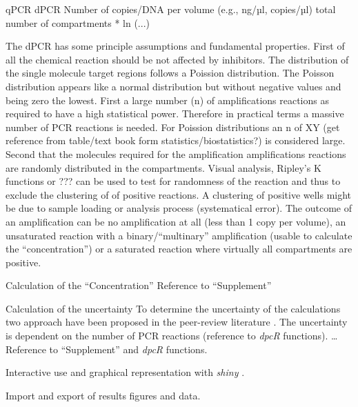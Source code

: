 \documentclass[a4,center,fleqn]{NAR}
\begin{document}
qPCR	dPCR
Number of copies/DNA per volume (e.g., ng/µl, copies/µl)	total number of compartments * ln (...)

The dPCR has some principle assumptions and fundamental properties. First of all 
the chemical reaction should be not affected by inhibitors. The distribution of 
the single molecule target regions follows a Poission distribution. The Poisson 
distribution appears like a normal distribution but without negative values and 
being zero the lowest. First a large number (n) of amplifications reactions as 
required to have a high statistical power. Therefore in practical terms a 
massive number of PCR reactions is needed. For Poission distributions an n of XY 
(get reference from table/text book form statistics/biostatistics?) is 
considered large. Second that the molecules required for the amplification 
amplifications reactions are randomly distributed in the compartments. Visual 
analysis, Ripley's K functions or ??? can be used to test for randomness of the 
reaction and thus to exclude the clustering of of positive reactions. A 
clustering of positive wells might be due to sample loading or analysis process 
(systematical error). The outcome of an amplification can be no amplification at 
all (less than 1 copy per volume), an unsaturated reaction with a 
binary/``multinary'' amplification (usable to calculate the ``concentration'') 
or a saturated reaction where virtually all compartments are positive.

Calculation of the ``Concentration''
Reference to ``Supplement''

Calculation of the uncertainty
To determine the uncertainty of the calculations two approach have been proposed 
in the peer-review literature \cite{dube_mathematical_2008, bhat_single_2009}. The uncertainty is 
dependent on the number of PCR reactions (reference to \textit{\textit{dpcR}} 
functions). … Reference to ``Supplement'' and \textit{dpcR} functions.



Interactive use and graphical representation with \textit{shiny} \cite{shiny}.

Import and export of results figures and data.
\end{document}
